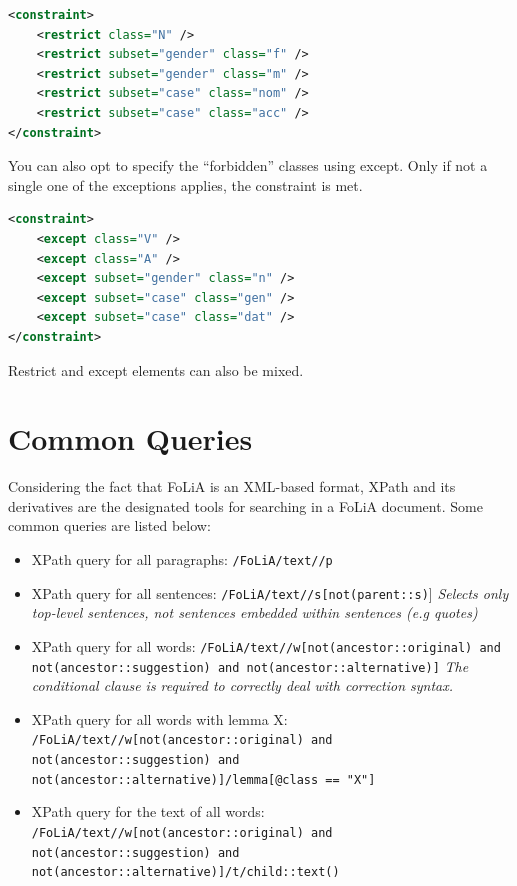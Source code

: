 \documentclass[a4paper,12pt]{report}
\begin{document}
\begin{lstlisting}[language=xml]
<constraint>
    <restrict class="N" />
    <restrict subset="gender" class="f" />
    <restrict subset="gender" class="m" />
    <restrict subset="case" class="nom" />
    <restrict subset="case" class="acc" />
</constraint>
\end{lstlisting}

You can also opt to specify the ``forbidden'' classes using except. Only if not a single one of the exceptions applies, the constraint is met. 

\begin{lstlisting}[language=xml]
<constraint>
    <except class="V" />
    <except class="A" />
    <except subset="gender" class="n" />
    <except subset="case" class="gen" />
    <except subset="case" class="dat" />
</constraint>
\end{lstlisting}

Restrict and except elements can also be mixed.


\appendix
\chapter{Common Queries}

Considering the fact that FoLiA is an XML-based format, XPath and its derivatives are the designated tools for searching in a FoLiA document. Some common queries are listed below:

\begin{itemize}
\item XPath query for all paragraphs: \texttt{/FoLiA/text//p}
\item XPath query for all sentences: \texttt{/FoLiA/text//s[not(parent::s)}] \emph{Selects only top-level sentences, not sentences embedded within sentences (e.g quotes)}
\item XPath query for all words: \texttt{/FoLiA/text//w[not(ancestor::original) and not(ancestor::suggestion) and not(ancestor::alternative)]} \emph{The conditional clause is required to correctly deal with correction syntax.}
\item XPath query for all words with lemma X: \\ \texttt{/FoLiA/text//w[not(ancestor::original) and not(ancestor::suggestion) and not(ancestor::alternative)]/lemma[@class == "X"]}
\item XPath query for the text of all words: \\ \texttt{/FoLiA/text//w[not(ancestor::original) and not(ancestor::suggestion) and not(ancestor::alternative)]/t/child::text()}
\end{itemize}
\end{document}
